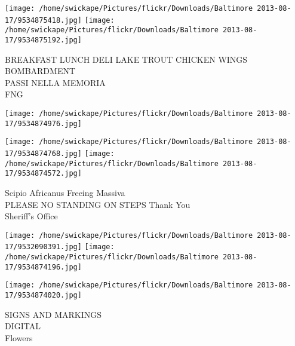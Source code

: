 \documentclass[10pt,letterpaper]{article}
\begin{document}
\texttt{[image: /home/swickape/Pictures/flickr/Downloads/Baltimore 2013-08-17/9534875418.jpg]}
\texttt{[image: /home/swickape/Pictures/flickr/Downloads/Baltimore 2013-08-17/9534875192.jpg]}

BREAKFAST LUNCH DELI LAKE TROUT CHICKEN WINGS\\
BOMBARDMENT\\
PASSI NELLA MEMORIA\\
FNG
\pagebreak

\texttt{[image: /home/swickape/Pictures/flickr/Downloads/Baltimore 2013-08-17/9534874976.jpg]}

\vspace{0.25in}
\texttt{[image: /home/swickape/Pictures/flickr/Downloads/Baltimore 2013-08-17/9534874768.jpg]}
\texttt{[image: /home/swickape/Pictures/flickr/Downloads/Baltimore 2013-08-17/9534874572.jpg]}

Scipio Africanus Freeing Massiva\\
PLEASE NO STANDING ON STEPS Thank You\\
Sheriff's Office
\pagebreak

\texttt{[image: /home/swickape/Pictures/flickr/Downloads/Baltimore 2013-08-17/9532090391.jpg]}
\texttt{[image: /home/swickape/Pictures/flickr/Downloads/Baltimore 2013-08-17/9534874196.jpg]}

\texttt{[image: /home/swickape/Pictures/flickr/Downloads/Baltimore 2013-08-17/9534874020.jpg]}

SIGNS AND MARKINGS\\
DIGITAL\\
Flowers
\pagebreak
\end{document}

